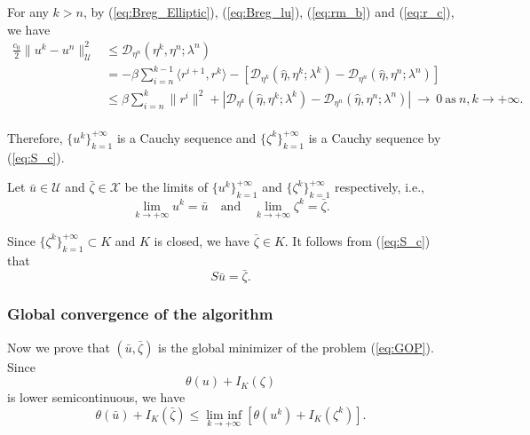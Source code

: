 \documentclass[leqno]{amsart}
\DeclareMathOperator*\lowlim{lim\ inf}
\theoremstyle{definition}
\begin{document}
For any $k>n$, by (\ref{eq:Breg_Elliptic}), (\ref{eq:Breg_lu}), (\ref{eq:rm_b}) and (\ref{eq:r_c}),  we have
\begin{equation}\nonumber
\begin{aligned}
\frac{c_0}{2}\|u^k - u^n\|_{\mathcal{U}}^2
& \leq \mathcal{D}_{\eta^{n}}(\eta^k,\eta^{n}; \lambda^{n})\\
& = -\beta\sum\limits_{i = n}^{k-1}\langle r^{i+1}, r^k\rangle - [\mathcal{D}_{\eta^{k}}(\hat{\eta},\eta^{k}; \lambda^{k}) - \mathcal{D}_{\eta^{n}}(\hat{\eta},\eta^{n}; \lambda^{n})]\\
& \leq  \beta\sum\limits_{i = n}^{k}\|r^{i}\|^2 + |\mathcal{D}_{\eta^{k}}(\hat{\eta},\eta^{k}; \lambda^{k}) - \mathcal{D}_{\eta^{n}}(\hat{\eta},\eta^{n}; \lambda^{n})|\ \rightarrow\ 0\ \mbox{as}\ n, k\rightarrow +\infty.\\
\end{aligned}
\end{equation}

Therefore, $\{u^k\}_{k=1}^{+\infty}$ is a Cauchy sequence and $\{\zeta^k\}_{k=1}^{+\infty}$ is a Cauchy sequence by (\ref{eq:S_c}). 

Let $\bar{u}\in \mathcal{U}$ and $\bar{\zeta}\in\mathcal{X}$ be the limits of $\{u^k\}_{k=1}^{+\infty}$ and $\{\zeta^k\}_{k=1}^{+\infty}$ respectively, i.e., 
\begin{equation}\label{eq:uzeta_c}
\lim\limits_{k\rightarrow + \infty}u^k = \bar{u}\quad \mbox{and}\quad \lim\limits_{k\rightarrow + \infty}\zeta^k = \bar{\zeta}.
\end{equation}

Since $\{ \zeta^k\}_{k=1}^{+\infty}\subset K$ and $K$ is closed, we have $\bar{\zeta}\in K$.  It follows from (\ref{eq:S_c}) that
\begin{equation}\label{eq:C_eq}
S\bar{u} = \bar{\zeta}.
\end{equation}

\subsubsection{Global convergence of the algorithm} Now we prove that $(\bar{u}, \bar{\zeta})$ is the global minimizer of the problem (\ref{eq:GOP}). Since 
$$ \theta(u) + I_K(\zeta)$$
is lower semicontinuous, we have
\begin{equation}\label{eq:O_l}
\theta(\bar{u}) + I_K(\bar{\zeta})\leq \lowlim\limits_{k\rightarrow +\infty}[\theta(u^k) + I_K(\zeta^k)].
\end{equation}
\end{document}
